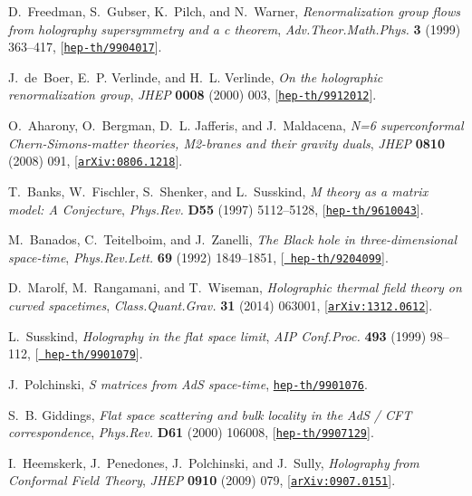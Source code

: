\documentclass[12pt,a4paper]{article}
\begin{document}
\begin{thebibliography}{100}
D.~Freedman, S.~Gubser, K.~Pilch, and N.~Warner, {\it {Renormalization group
  flows from holography supersymmetry and a c theorem}},  {\em
  Adv.Theor.Math.Phys.} {\bf 3} (1999) 363--417,
  [\href{http://xxx.lanl.gov/abs/hep-th/9904017}{{\tt hep-th/9904017}}].

J.~de~Boer, E.~P. Verlinde, and H.~L. Verlinde, {\it {On the holographic
  renormalization group}},  {\em JHEP} {\bf 0008} (2000) 003,
  [\href{http://xxx.lanl.gov/abs/hep-th/9912012}{{\tt hep-th/9912012}}].

O.~Aharony, O.~Bergman, D.~L. Jafferis, and J.~Maldacena, {\it {N=6
  superconformal Chern-Simons-matter theories, M2-branes and their gravity
  duals}},  {\em JHEP} {\bf 0810} (2008) 091,
  [\href{http://xxx.lanl.gov/abs/0806.1218}{{\tt arXiv:0806.1218}}].

T.~Banks, W.~Fischler, S.~Shenker, and L.~Susskind, {\it {M theory as a matrix
  model: A Conjecture}},  {\em Phys.Rev.} {\bf D55} (1997) 5112--5128,
  [\href{http://xxx.lanl.gov/abs/hep-th/9610043}{{\tt hep-th/9610043}}].

M.~Banados, C.~Teitelboim, and J.~Zanelli, {\it {The Black hole in
  three-dimensional space-time}},  {\em Phys.Rev.Lett.} {\bf 69} (1992)
  1849--1851, [\href{http://xxx.lanl.gov/abs/hep-th/9204099}{{\tt
  hep-th/9204099}}].

D.~Marolf, M.~Rangamani, and T.~Wiseman, {\it {Holographic thermal field theory
  on curved spacetimes}},  {\em Class.Quant.Grav.} {\bf 31} (2014) 063001,
  [\href{http://xxx.lanl.gov/abs/1312.0612}{{\tt arXiv:1312.0612}}].

L.~Susskind, {\it {Holography in the flat space limit}},  {\em AIP Conf.Proc.}
  {\bf 493} (1999) 98--112, [\href{http://xxx.lanl.gov/abs/hep-th/9901079}{{\tt
  hep-th/9901079}}].

J.~Polchinski, {\it {S matrices from AdS space-time}},
  \href{http://xxx.lanl.gov/abs/hep-th/9901076}{{\tt hep-th/9901076}}.

S.~B. Giddings, {\it {Flat space scattering and bulk locality in the AdS / CFT
  correspondence}},  {\em Phys.Rev.} {\bf D61} (2000) 106008,
  [\href{http://xxx.lanl.gov/abs/hep-th/9907129}{{\tt hep-th/9907129}}].

I.~Heemskerk, J.~Penedones, J.~Polchinski, and J.~Sully, {\it {Holography from
  Conformal Field Theory}},  {\em JHEP} {\bf 0910} (2009) 079,
  [\href{http://xxx.lanl.gov/abs/0907.0151}{{\tt arXiv:0907.0151}}].


\end{thebibliography}
\end{document}
